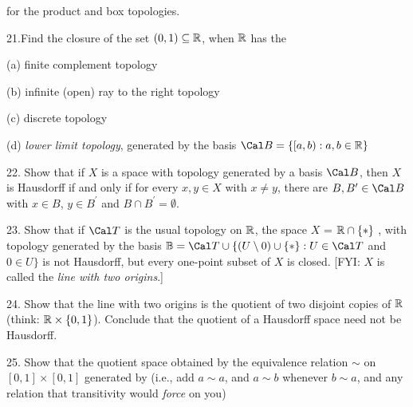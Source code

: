 for  the product and box topologies.



\ssk

\item{21.}Find the closure of the set $(0,1)\subseteq{\Bbb R}$, when ${\Bbb R}$
has the 

\msk

(a) finite complement topology

\ssk

(b) infinite (open) ray to the right topology

\ssk

(c) discrete topology

\ssk

(d) {\it lower limit topology}, generated by the basis ${\Cal B} = \{[a,b) : a,b\in {\Bbb R}\}$

\ssk
\item{22.} Show that if $X$ is a space with topology generated by a basis ${\Cal B}$, 
then $X$ is Hausdorff if and only if for every $x,y\in X$ with $x\neq y$, there are
$B,B^\prime\in {\Cal B}$ with $x\in B$, $y\in B^\prime$ and $B\cap B^\prime = \emptyset$.

\ssk

\item{23.} Show that if ${\Cal T}$ is the usual topology on ${\Bbb R}$, the space $X$ = 
${\Bbb R}\cap \{*\}$ , with topology generated by the basis ${\Bbb B} = 
{\Cal T} \cup \{(U\setminus 0)\cup\{*\} : U\in {\Cal T}$ and $0\in U\}$ is not Hausdorff, 
but every one-point subset of $X$ is closed. [FYI: $X$ is called the {\it line with two origins}.]

\ssk

\item{24.} Show that the line with two origins is the quotient of two disjoint
copies of ${\Bbb R}$ (think: ${\Bbb R}\times \{0,1\}$). Conclude that the quotient of a 
Hausdorff space need not be Hausdorff.

\ssk

\item{25.} Show that the quotient space obtained by the equivalence relation $\sim$
on $[0,1]\times [0,1]$ generated by (i.e., add $a\sim a$, and $a\sim b$ whenever $b\sim a$, and
any relation that transitivity would {\it force} on you)

\ssk


\ssk

